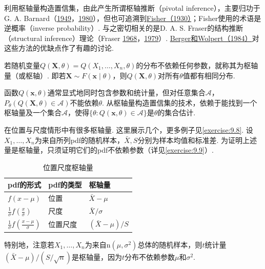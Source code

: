 利用枢轴量构造置信集，由此产生所谓枢轴推断（pivotal inference），主要归功于G. A. Barnard（\hyperref[bib:source10]{1949}，\hyperref[bib:source11]{1980}），但也可追溯到\hyperref[bib:source124]{Fisher（1930）}；Fisher使用的术语是逆概率（inverse probability）. 与之密切相关的是D. A. S. Fraser的结构推断（structural inference）理论（Fraser \hyperref[bib:source127]{1968}，\hyperref[bib:source128]{1979}）. \hyperref[bib:source22]{Berger和Wolpert（1984）}对这些方法的优缺点作了有趣的讨论.
\begin{definition}\label{def:9.2.6}
若随机变量$Q(\boldsymbol X,\theta)=Q(X_1,\ldots,X_n,\theta)$的分布不依赖任何参数，就称其为枢轴量（或枢轴）. 即若$\boldsymbol X\sim F(\boldsymbol x\mid\theta)$，则$Q(\boldsymbol X,\theta)$对所有$\theta$值都有相同分布.
\end{definition}
函数$Q(\boldsymbol x,\theta)$通常显式地同时包含参数和统计量，但对任意集合$\mathcal A$，$P_\theta(Q(\boldsymbol X,\theta)\in\mathcal A)$不能依赖$\theta$. 从枢轴量构造置信集的技术，依赖于能找到一个枢轴量及一个集合$\mathcal A$，使得$\{\theta:Q(\boldsymbol x,\theta)\in\mathcal A\}$是$\theta$的集合估计.
\begin{example}[位置尺度枢轴量]\label{ex:9.2.7}
在位置与尺度情形中有很多枢轴量. 这里展示几个，更多例子见\autoref{exercise:9.8}. 设$X_1,\ldots,X_n$为来自所列pdf的随机样本，$\bar X,S$分别为样本均值和标准差. 为证明上述量是枢轴量，只须证明它们的pdf不依赖参数（详见\autoref{exercise:9.9}）.
\par
\begin{table}[htbp]\centering
\caption{位置尺度枢轴量}\label{tab:9.2.1}
\begin{tabular}{lll}\toprule
pdf的形式&pdf的类型&枢轴量\\\midrule
$f(x-\mu)$&位置&$\bar X-\mu$\\
$\frac1\sigma f(\frac x\sigma)$&尺度&$\bar X/\sigma$\\
$\frac1\sigma f(\frac{x-\mu}\sigma)$&位置尺度&$(\bar X-\mu)/S$\\\bottomrule
\end{tabular}
\end{table}
\par
特别地，注意若$X_1,\ldots,X_n$为来自$\mathrm n(\mu,\sigma^2)$总体的随机样本，则$t$统计量$(\bar X-\mu)/(S/\sqrt n)$是枢轴量，因为$t$分布不依赖参数$\mu$和$\sigma^2$.
\end{example}
